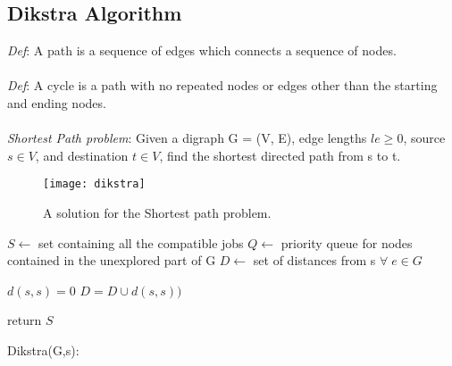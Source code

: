 \clearpage

\subsection{Dikstra Algorithm}

\emph{Def}: A path is a sequence of edges which connects a sequence of nodes.\\\\
\emph{Def}: A cycle is a path with no repeated nodes or edges other than the
starting and ending nodes.\\\\
\emph{Shortest Path problem}: Given a digraph G = (V, E), edge lengths $le \geq 0$, source $s \in V$, and destination $t \in V$, find the shortest directed path from s to t.

\begin{figure}[H]
    \centering
    \texttt{[image: dikstra]}
    \caption{A solution for the Shortest path problem.}
\end{figure}

\begin{algorithm}[H]
    \SetAlgoLined
    \small
    \BlankLine

    $S \leftarrow$ set containing all the compatible jobs\;
    $Q \leftarrow$ priority queue for nodes contained in the unexplored part of G \;
    $D \leftarrow$ set of distances from s $\forall \; e \in G$

    \BlankLine

    $d(s,s) = 0$\;
    $D = D \cup d(s,s))$\;

    \BlankLine


    \BlankLine


    return $S$\;
    \caption{Dikstra(G,s):}
\end{algorithm}

